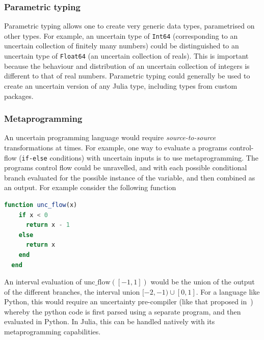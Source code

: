 \documentclass{juliacon}
\begin{document}
\subsubsection{Parametric typing}
Parametric typing allows one to create very generic data types, parametrised on other types. For example, an uncertain type of \texttt{Int64} (corresponding to an uncertain collection of finitely many numbers) could be distinguished to an uncertain type of \texttt{Float64} (an uncertain collection of reals). This is important because the behaviour and distribution of an uncertain collection of integers is different to that of real numbers. Parametric typing could generally be used to create an uncertain version of any Julia type, including types from custom packages.

\subsubsection{Metaprogramming}
An uncertain programming language would require \textit{source-to-source} transformations at times. For example, one way to evaluate a programs control-flow (\texttt{if-else} conditions) with uncertain inputs is to use metaprogramming. The programs control flow could be unravelled, and with each possible conditional branch evaluated for the possible instance of the variable, and then combined as an output. For example consider the following function
\begin{lstlisting}[language = Julia]
  function unc_flow(x)
    if x < 0 
      return x - 1
    else 
      return x
    end
  end
\end{lstlisting}
\noindent An interval evaluation of $\text{unc\_flow}([-1,1])$ would be the union of the output of the different branches, the interval union $[-2, -1) \cup [0, 1]$. For a language like Python, this would require an uncertainty pre-compiler (like that proposed in~\cite{gray2019computing}) whereby the python code is first parsed using a separate program, and then evaluated in Python. In Julia, this can be handled natively with its metaprogramming capabilities.
\end{document}
